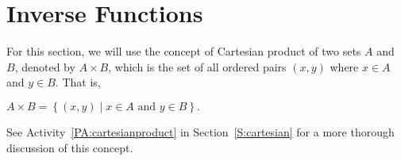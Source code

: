 \section{Inverse Functions} \label{S:inversefunctions}
\setcounter{previewactivity}{0}
%
For this section, we will use the concept of Cartesian product of two sets $A$ and $B$, denoted by $A \times B$, which is the set of all ordered pairs $(x, y)$ where $x \in A$ and $y \in B$.  That is,
\begin{center}
$A \times B = \left\{ { {\left( {x,y} \right)} \mid x \in A\text{ and }y \in B} \right\}.$
\end{center}
See \typeu Activity~\ref*{PA:cartesianproduct} in Section~\ref{S:cartesian} for a more thorough discussion of this concept. 


%
\setcounter{equation}{0}




%

\endinput


